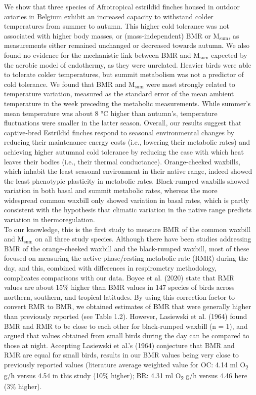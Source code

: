 \documentclass[10pt, twoside]{book} %
\begin{document}
We show that three species of Afrotropical estrildid finches housed in outdoor aviaries in Belgium exhibit an increased capacity to withstand colder temperatures from summer to autumn. This higher cold tolerance was not associated with higher body masses, or (mass-independent) BMR or M$_{\text{sum}}$, as measurements either remained unchanged or decreased towards autumn. We also found no evidence for the mechanistic link between BMR and M$_{\text{sum}}$ expected by the aerobic model of endothermy, as they were unrelated. Heavier birds were able to tolerate colder temperatures, but summit metabolism was not a predictor of cold tolerance. We found that BMR and M$_{\text{sum}}$ were most strongly related to temperature variation, measured as the standard error of the mean ambient temperature in the week preceding the metabolic measurements. While summer's mean temperature was about 8 °C higher than autumn's, temperature fluctuations were smaller in the latter season. Overall, our results suggest that captive-bred Estrildid finches respond to seasonal environmental changes by reducing their maintenance energy costs (i.e., lowering their metabolic rates) and achieving higher autumnal cold tolerance by reducing the ease with which heat leaves their bodies (i.e., their thermal conductance). Orange-cheeked waxbills, which inhabit the least seasonal environment in their native range, indeed showed the least phenotypic plasticity in metabolic rates. Black-rumped waxbills showed variation in both basal and summit metabolic rates, whereas the more widespread common waxbill only showed variation in basal rates, which is partly consistent with the hypothesis that climatic variation in the native range predicts variation in thermoregulation.\\

To our knowledge, this is the first study to measure BMR of the common waxbill and M$_{\text{sum}}$ on all three study species. Although there have been studies addressing BMR of the orange-cheeked waxbill and the black-rumped waxbill, most of these focused on measuring the active-phase/resting metabolic rate (RMR) during the day, and this, combined with differences in respirometry methodology, complicates comparisons with our data. Boyce et al. (2020) state that RMR values are about 15\% higher than BMR values in 147 species of birds across northern, southern, and tropical latitudes. By using this correction factor to convert RMR to BMR, we obtained estimates of BMR that were generally higher than previously reported (see Table 1.2). However, Lasiewski et al. (1964) found BMR and RMR to be close to each other for black-rumped waxbill (n = 1), and argued that values obtained from small birds during the day can be compared to those at night. Accepting Lasiewski et al.’s (1964) conjecture that BMR and RMR are equal for small birds, results in our BMR values being very close to previously reported values (literature average weighted value for OC: 4.14 ml O\textsubscript{2} g/h versus 4.54 in this study (10\% higher); BR: 4.31 ml O\textsubscript{2} g/h versus 4.46 here (3\% higher).
\end{document}
